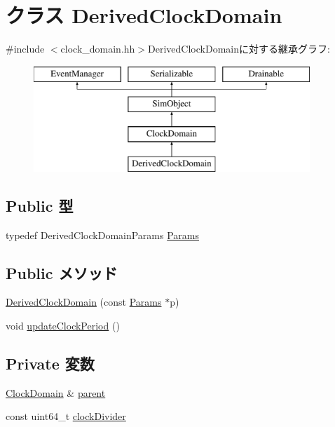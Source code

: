 \hypertarget{classDerivedClockDomain}{
\section{クラス DerivedClockDomain}
\label{classDerivedClockDomain}
}


{\ttfamily \#include $<$clock\_\-domain.hh$>$}DerivedClockDomainに対する継承グラフ:\begin{figure}[H]
\begin{center}
\leavevmode
\includegraphics[height=4cm]{classDerivedClockDomain}
\end{center}
\end{figure}
\subsection*{Public 型}
\begin{DoxyCompactItemize}
\item 
typedef DerivedClockDomainParams \hyperlink{classDerivedClockDomain_a10c51f81ae9968953f7d5c0ee20546c6}{Params}
\end{DoxyCompactItemize}
\subsection*{Public メソッド}
\begin{DoxyCompactItemize}
\item 
\hyperlink{classDerivedClockDomain_a816eac6a1295742a75f85f70e144ac18}{DerivedClockDomain} (const \hyperlink{classDerivedClockDomain_a10c51f81ae9968953f7d5c0ee20546c6}{Params} $\ast$p)
\item 
void \hyperlink{classDerivedClockDomain_a0629a73fecc22f407351ee5630e8a2f9}{updateClockPeriod} ()
\end{DoxyCompactItemize}
\subsection*{Private 変数}
\begin{DoxyCompactItemize}
\item 
\hyperlink{classClockDomain_1_1ClockDomain}{ClockDomain} \& \hyperlink{classDerivedClockDomain_a95cdc68e9450163b78382463aa16ec33}{parent}
\item 
const uint64\_\-t \hyperlink{classDerivedClockDomain_ae50eb75652dfa3720bbfefdf17308e0f}{clockDivider}
\end{DoxyCompactItemize}


